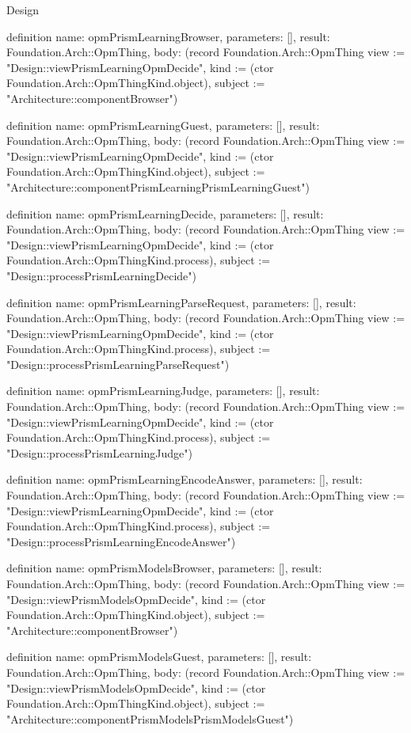 \begin{lexlean}{Design}
\begin{semanticmodule}
definition{
  name: opmPrismLearningBrowser,
  parameters: [],
  result: Foundation.Arch::OpmThing,
  body: (record Foundation.Arch::OpmThing {view := "Design::viewPrismLearningOpmDecide", kind := (ctor Foundation.Arch::OpmThingKind.object), subject := "Architecture::componentBrowser"})
}

definition{
  name: opmPrismLearningGuest,
  parameters: [],
  result: Foundation.Arch::OpmThing,
  body: (record Foundation.Arch::OpmThing {view := "Design::viewPrismLearningOpmDecide", kind := (ctor Foundation.Arch::OpmThingKind.object), subject := "Architecture::componentPrismLearningPrismLearningGuest"})
}

definition{
  name: opmPrismLearningDecide,
  parameters: [],
  result: Foundation.Arch::OpmThing,
  body: (record Foundation.Arch::OpmThing {view := "Design::viewPrismLearningOpmDecide", kind := (ctor Foundation.Arch::OpmThingKind.process), subject := "Design::processPrismLearningDecide"})
}

definition{
  name: opmPrismLearningParseRequest,
  parameters: [],
  result: Foundation.Arch::OpmThing,
  body: (record Foundation.Arch::OpmThing {view := "Design::viewPrismLearningOpmDecide", kind := (ctor Foundation.Arch::OpmThingKind.process), subject := "Design::processPrismLearningParseRequest"})
}

definition{
  name: opmPrismLearningJudge,
  parameters: [],
  result: Foundation.Arch::OpmThing,
  body: (record Foundation.Arch::OpmThing {view := "Design::viewPrismLearningOpmDecide", kind := (ctor Foundation.Arch::OpmThingKind.process), subject := "Design::processPrismLearningJudge"})
}

definition{
  name: opmPrismLearningEncodeAnswer,
  parameters: [],
  result: Foundation.Arch::OpmThing,
  body: (record Foundation.Arch::OpmThing {view := "Design::viewPrismLearningOpmDecide", kind := (ctor Foundation.Arch::OpmThingKind.process), subject := "Design::processPrismLearningEncodeAnswer"})
}

definition{
  name: opmPrismModelsBrowser,
  parameters: [],
  result: Foundation.Arch::OpmThing,
  body: (record Foundation.Arch::OpmThing {view := "Design::viewPrismModelsOpmDecide", kind := (ctor Foundation.Arch::OpmThingKind.object), subject := "Architecture::componentBrowser"})
}

definition{
  name: opmPrismModelsGuest,
  parameters: [],
  result: Foundation.Arch::OpmThing,
  body: (record Foundation.Arch::OpmThing {view := "Design::viewPrismModelsOpmDecide", kind := (ctor Foundation.Arch::OpmThingKind.object), subject := "Architecture::componentPrismModelsPrismModelsGuest"})
}


\end{semanticmodule}
\end{lexlean}
